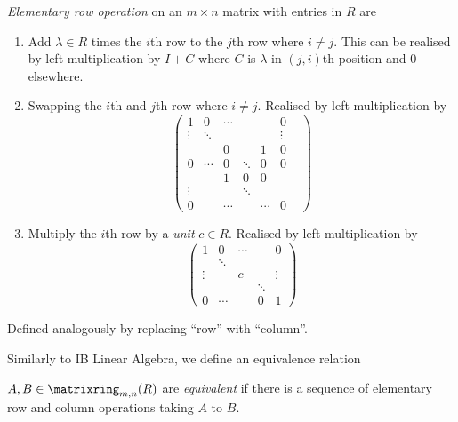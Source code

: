 \documentclass[a4paper]{article}
\theoremstyle{definition}
\begin{document}
\begin{definition}
  \emph{Elementary row operation} on an \(m \times n\) matrix with entries in \(R\) are
  \begin{enumerate}
  \item Add \(\lambda \in R\) times the \(i\)th row to the \(j\)th row where \(i \neq j\). This can be realised by left multiplication by \(I + C\) where \(C\) is \(\lambda\) in \((j, i)\)th position and \(0\) elsewhere.
  \item Swapping the \(i\)th and \(j\)th row where \(i \neq j\). Realised by left multiplication by
  \[
    \begin{pmatrix}
      1 & 0 & \cdots & & & 0 \\
      \vdots & \ddots & & & & \vdots \\
      & & 0 & & 1 & 0 \\
      0 & \cdots & 0 & \ddots & 0 & 0 \\
      & & 1 & 0 & 0 & & \\
      \vdots & &&  \ddots & \\
      0 & & \cdots & & \cdots & 0
    \end{pmatrix}
  \]
\item Multiply the \(i\)th row by a \emph{unit} \(c \in R\). Realised by left multiplication by
  \[
    \begin{pmatrix}
      1 & 0 & \cdots & & 0 \\
       & \ddots & & & \\
      \vdots & & c & & \vdots \\
       & & & \ddots & \\
      0 & \cdots & & 0 & 1
    \end{pmatrix}
  \]
  \end{enumerate}
\end{definition}

\begin{definition}
  Defined analogously by replacing ``row'' with ``column''.
\end{definition}

Similarly to IB Linear Algebra, we define an equivalence relation

\begin{definition}[Equivalence]
  \(A, B \in \matrixring_{m, n}(R)\) are \emph{equivalent} if there is a sequence of elementary row and column operations taking \(A\) to \(B\).
\end{definition}
\end{document}
